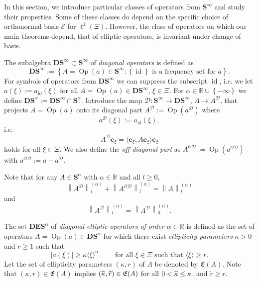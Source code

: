 \documentclass[AHL,Unicode,longabstracts,published]{cedram}
\DeclareMathOperator{\Op}{Op}
\DeclareMathOperator{\id}{id}
\newcommand{\R}{\mathbb R}
\newcommand{\CD}{\mathcal{D}}
\newcommand{\CE}{\mathcal{E}}
\newcommand{\CO}{\mathcal{O}}
\newcommand{\COD}{{\CO\CD}}
\newcommand{\BD}{\mathbf D}
\newcommand{\BE}{\mathbf E}
\newcommand{\BS}{\mathbf S}
\newcommand{\be}{\mathbf e}
\newcommand{\FE}{\mathfrak{E}}
\newcommand{\set}[1]{\left\{ #1 \right\}}
\newcommand{\snorm}[3]{\left\| #1\right\|_{#3}^{(#2)}}
\newcommand{\ang}[1]{\langle #1 \rangle}
\newcommand{\er}{r}
\let\oldtilde\tilde
\renewcommand*{\tilde}[1]{\mathchoice{\widetilde{#1}}{\widetilde{#1}}{\oldtilde{#1}}{\oldtilde{#1}}}
\begin{document}
In this section, we introduce particular classes of operators from $\BS^\infty$ and study their properties. Some of these classes do depend on the specific choice of orthonormal basis $\CE$ for $\ell^2(\Xi)$. However, the class of operators on which our main theorems depend, that of elliptic operators, is invariant under change of basis.

\begin{defi}\label{def:dapo}
The subalgebra $\BD\BS^\infty \subset \BS^\infty$ of \emph{diagonal operators} is defined as
\begin{equation}
\BD\BS^\infty := \set{A = \Op(a) \in \BS^\infty:\set{\id} \text{ is a frequency set for } a}.\label{eq:dapo}
\end{equation}
For symbols of operators from $\BD\BS^\infty$ we can suppress the subscript $\id$, i.e. we let $a(\xi) :=a_{\id}(\xi)$ for all $A =\Op(a)\in\BD\BS^\infty$, $\xi\in\Xi$. For $\alpha \in \R\cup \set{-\infty}$ we define $\BD\BS^\alpha := \BD\BS^\infty \cap \BS^\alpha$. Introduce the map $\CD : \BS^\infty \to \BD\BS^\infty$, $A\mapsto A^\CD$, that projects $A=\Op(a)$ onto its diagonal part $A^\CD:= \Op(a^\CD)$ where
\begin{equation}
a^\CD(\xi) := a_{\id}(\xi),
\end{equation}
i.e.
\begin{equation}
A^\CD\be_{\xi} =\langle\be_{\xi}, A\be_{\xi}\rangle \be_{\xi}
\end{equation}
holds for all $\xi \in\Xi$. We also define the \emph{off-diagonal part} as $A^{\CO\CD} := \Op(a^{\CO\CD})$ with $a^{\CO\CD}:=a-a^\CD$.
\end{defi}

Note that for any $A\in\BS^\alpha$ with $\alpha\in\R$ and all $l\geq 0$,
\begin{equation}\label{eq:partition}
\snorm{A^{\CD}}{\alpha}{l}+\snorm{A^{\COD}}{\alpha}{l}=\snorm{A}{\alpha}{l}
\end{equation}
and
\begin{equation}\label{eq:diagonal l irrelevant}
\snorm{A^\CD}{\alpha}{l} =\snorm{A^\CD}{\alpha}{0}.
\end{equation}

\begin{defi}\label{def:DES}
The set $\BD\BE\BS^\alpha$ of \emph{diagonal elliptic operators of order $\alpha\in\R$} is defined as the set of operators $A = \Op(a) \in \BD\BS^\alpha$ for which there exist \emph{ellipticity parameters} $\kappa> 0$ and $\er\ge 1$ such that
\begin{equation}\label{eq:ellconst}
|a(\xi)|\geq \kappa\ang{\xi}^\alpha \qquad \text{ for all $\xi\in\Xi$ such that }\ang{\xi}\geq
\er.
\end{equation}
Let the set of ellipticity parameters $(\kappa, \er)$ of $A$ be denoted by $\FE(A)$. Note that $(\kappa, \er)\in \FE(A)$ implies $(\tilde \kappa,\widetilde
\er)\in \FE(A)$ for all $0 <\tilde \kappa\leq \kappa$, and $\widetilde \er \geq \!
\er$.
\end{defi}
\end{document}
